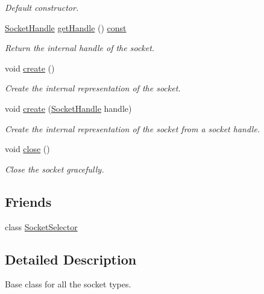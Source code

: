\begin{DoxyCompactItemize}
\begin{DoxyCompactList}\small\item\em Default constructor. \end{DoxyCompactList}\item 
\hyperlink{namespacesf_aefabb521d8f5eec9e6a9b521271d20d1}{Socket\-Handle} \hyperlink{classsf_1_1_socket_ac0c63b13e61da8294bf54e888e97f9a3}{get\-Handle} () \hyperlink{term__entry_8h_a57bd63ce7f9a353488880e3de6692d5a}{const} 
\begin{DoxyCompactList}\small\item\em Return the internal handle of the socket. \end{DoxyCompactList}\item 
void \hyperlink{classsf_1_1_socket_aafbe140f4b1921e0d19e88cf7a61dcbc}{create} ()
\begin{DoxyCompactList}\small\item\em Create the internal representation of the socket. \end{DoxyCompactList}\item 
void \hyperlink{classsf_1_1_socket_af1dd898f7aa3ead7ff7b2d1c20e97781}{create} (\hyperlink{namespacesf_aefabb521d8f5eec9e6a9b521271d20d1}{Socket\-Handle} handle)
\begin{DoxyCompactList}\small\item\em Create the internal representation of the socket from a socket handle. \end{DoxyCompactList}\item 
void \hyperlink{classsf_1_1_socket_a71f2f5c2aa99e01cafe824fee4c573be}{close} ()
\begin{DoxyCompactList}\small\item\em Close the socket gracefully. \end{DoxyCompactList}\end{DoxyCompactItemize}
\subsection*{Friends}
\begin{DoxyCompactItemize}
\item 
class \hyperlink{classsf_1_1_socket_a4d597c43b180384801eff14207b0e137}{Socket\-Selector}
\end{DoxyCompactItemize}


\subsection{Detailed Description}
Base class for all the socket types. 


